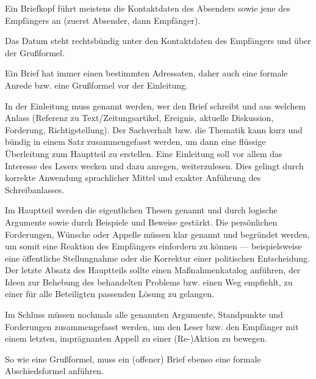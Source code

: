 \begin{enumerate}


	Ein Briefkopf f\"{u}hrt meistens die Kontaktdaten des Absenders sowie jene des Empf\"{a}ngers an (zuerst Absender, dann Empf\"{a}nger).


	Das Datum steht rechtsb\"{u}ndig unter den Kontaktdaten des Empf\"{a}ngers und \"{u}ber der Gru\ss{}formel. 


	Ein Brief hat immer einen bestimmten Adressaten, daher auch eine formale Anrede bzw. eine Gru\ss{}formel vor der Einleitung. 


	In der Einleitung muss genannt werden, wer den Brief schreibt und aus welchem Anlass (Referenz zu Text/Zeitungsartikel, Ereignis, aktuelle Diskussion, Forderung, Richtigstellung). Der Sachverhalt bzw. die Thematik kann kurz und b\"{u}ndig in einem Satz zusammengefasst werden, um dann eine fl\"{u}ssige \"{U}berleitung zum Hauptteil zu erstellen. Eine Einleitung soll vor allem das Interesse des Lesers wecken und dazu anregen, weiterzulesen. Dies gelingt durch korrekte Anwendung sprachlicher Mittel und exakter Anf\"{u}hrung des Schreibanlasses.


	Im Hauptteil werden die eigentlichen Thesen genannt und durch logische Argumente sowie durch Beispiele und Beweise gest\"{a}rkt. Die pers\"{o}nlichen Forderungen, W\"{u}nsche oder Appelle m\"{u}ssen klar genannt und begr\"{u}ndet werden, um somit eine Reaktion des Empf\"{a}ngers einfordern zu k\"{o}nnen --- beispielsweise eine \"{o}ffentliche Stellungnahme oder die Korrektur einer politischen Entscheidung. Der letzte Absatz des Hauptteils sollte einen Ma\ss{}nahmenkatalog anf\"{u}hren, der Ideen zur Behebung des behandelten Problems bzw. einen Weg empfiehlt, zu einer f\"{u}r alle Beteiligten passenden L\"{o}sung zu gelangen.


	Im Schluss m\"{u}ssen nochmals alle genannten Argumente, Standpunkte und Forderungen zusammengefasst werden, um den Leser bzw. den Empf\"{a}nger mit einem letzten, impr\"{a}gnanten Appell zu einer (Re-)Aktion zu bewegen.


	So wie eine Gru\ss{}formel, muss ein (offener) Brief ebenso eine formale Abschiedsformel anf\"{u}hren.

\end{enumerate}

